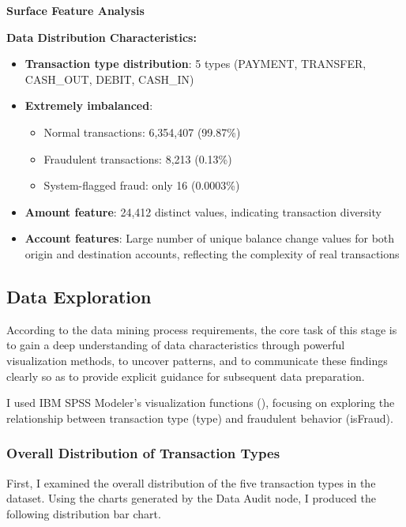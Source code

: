 \documentclass[sigplan,screen]{acmart}
\begin{document}
\vspace{0.3cm}

\textbf{Surface Feature Analysis}

\textbf{Data Distribution Characteristics:}

\begin{itemize}
\item \textbf{Transaction type distribution}: 5 types (PAYMENT, TRANSFER, CASH\_OUT, DEBIT, CASH\_IN)

\item \textbf{Extremely imbalanced}:
    \begin{itemize}
    \item Normal transactions: 6,354,407 (99.87\%)
    \item Fraudulent transactions: 8,213 (0.13\%)
    \item System-flagged fraud: only 16 (0.0003\%)
    \end{itemize}

\item \textbf{Amount feature}: 24,412 distinct values, indicating transaction diversity

\item \textbf{Account features}: Large number of unique balance change values for both origin and destination accounts, reflecting the complexity of real transactions
\end{itemize}

\subsection{Data Exploration}
According to the data mining process requirements, the core task of this stage is to gain a deep understanding of data characteristics through powerful visualization methods, to uncover patterns, and to communicate these findings clearly so as to provide explicit guidance for subsequent data preparation.

I used IBM SPSS Modeler's visualization functions (\cite{ibm_modeler_docs}), focusing on exploring the relationship between transaction type (type) and fraudulent behavior (isFraud).

\subsubsection{Overall Distribution of Transaction Types}

First, I examined the overall distribution of the five transaction types in the dataset. Using the charts generated by the Data Audit node, I produced the following distribution bar chart.
\end{document}
